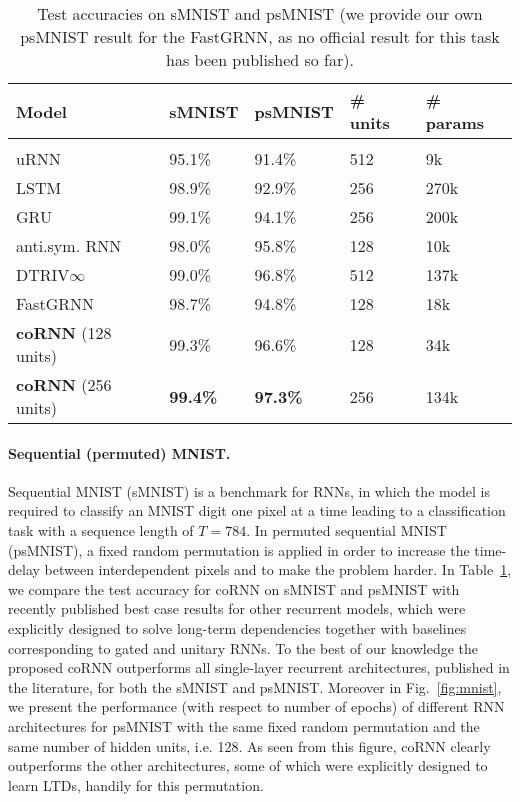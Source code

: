\documentclass{article} \usepackage{iclr2021_conference,times}
\newcommand{\fref}[1] {Fig.~\ref{#1}}
\newcommand{\Tref}[1]{Table~\ref{#1}}
\begin{document}
\begin{table}[h!]
\caption{Test accuracies on sMNIST and psMNIST (we provide our own psMNIST result for the FastGRNN, as no official result for this task has been published so far).}
\label{tab:mnist}
\begin{center}
\begin{tabular}{lllll}
Model & sMNIST &  psMNIST &  \# units & { \# params}
\\ \hline \\
uRNN \citep{urnn} & 95.1\%& 91.4\% & 512 & 9k\\
LSTM \citep{scornn} &98.9\% & 92.9\% & 256 & 270k \\
GRU \citep{GRU_results} & 99.1\%&94.1\% & 256& 200k\\
anti.sym. RNN \citep{anti}  & 98.0\% & 95.8\% & 128 & 10k\\
DTRIV$\infty$ \citep{dtriv}& 99.0\%& 96.8\% &512 & 137k \\
FastGRNN \citep{fastrnn} & 98.7\% & 94.8\% & 128 & 18k\\
\textbf{coRNN} (128 units) &99.3\% & 96.6\%&128& 34k\\
\textbf{coRNN} (256 units)&\bf{99.4}\%& \bf{97.3}\%&256& 134k\\
\end{tabular}
\end{center}
\end{table}
\paragraph{Sequential (permuted) MNIST.}
Sequential MNIST (sMNIST) \citep{seq_mnist} is a benchmark for RNNs, in which the model is required to classify an MNIST \citep{mnist} digit one pixel at a time leading to a classification task with a sequence length of $T=784$. In permuted sequential MNIST (psMNIST), a fixed random permutation is applied in order to increase the time-delay between interdependent pixels and to make the problem harder. In \Tref{tab:mnist}, we compare the test accuracy for coRNN on sMNIST and psMNIST with recently published best case results for other recurrent models, which were explicitly designed to solve long-term dependencies together with baselines corresponding to gated and unitary RNNs. To the best of our knowledge the proposed coRNN outperforms all single-layer recurrent architectures, published in the literature, for both the sMNIST and psMNIST. 
Moreover in \fref{fig:mnist}, we present the performance (with respect to number of epochs) of different RNN architectures for psMNIST with the same fixed random permutation and the same number of hidden units, i.e. 128. As seen from this figure, coRNN clearly outperforms the other architectures, some of which were explicitly designed to learn LTDs, handily for this permutation.
\end{document}
